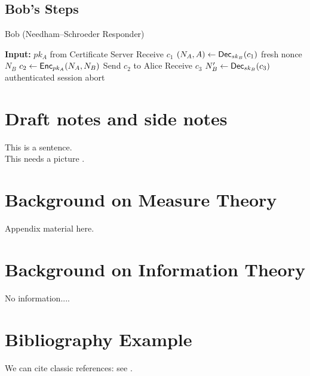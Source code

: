\documentclass[11pt]{article}
\begin{document}
\subsection{Bob's Steps}
\begin{algorithm}
\caption{Bob (Needham--Schroeder Responder)}
\begin{algorithmic}[1]
\State \textbf{Input:} $pk_A$ from Certificate Server
\State Receive $c_1$
\State $(N_A, A) \gets \mathsf{Dec}_{sk_B}(c_1)$
\State \algorithmicchoose fresh nonce $N_B$
\State $c_2 \gets \mathsf{Enc}_{pk_A}(N_A, N_B)$
\State Send $c_2$ to Alice
\State Receive $c_3$
\State $N_B' \gets \mathsf{Dec}_{sk_B}(c_3)$
  \State \algorithmicreturn authenticated session
\Else
  \State \algorithmicreturn abort
\EndIf
\end{algorithmic}
\end{algorithm}


\section{Draft notes and side notes}
This is a sentence.  \\
This needs a picture .

\newpage
\appendix
\section{Background on Measure Theory}
Appendix material here.

\section{Background on Information Theory}
No information....

\section{Bibliography Example}
We can cite classic references: see \cite{rudin1987real,cover2006elements}.

\newpage
\printbibliography
\end{document}
